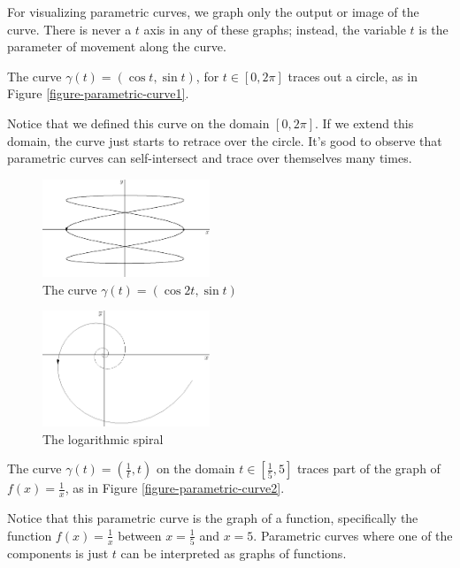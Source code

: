 \documentclass[fleqn,letterpaper]{report}
\begin{document}
For visualizing parametric curves, we graph only the output or
image of the curve. There is never a $t$ axis in any of these
graphs; instead, the variable $t$ is the parameter of movement
along the curve. 

\begin{example}
The curve $\gamma(t) = (\cos t, \sin t)$, for $t \in [0,
2\pi]$ traces out a circle, as in Figure
\ref{figure-parametric-curve1}. 
\end{example}

Notice that we defined this curve on the domain $[0, 2\pi]$. If
we extend this domain, the curve just starts to retrace over
the circle. It's good to observe that parametric curves can
self-intersect and trace over themselves many times.

\begin{figure}[t]
\centering
\includegraphics[width=5cm]{figure12.eps}
\caption{The curve $\gamma(t) = (\cos 2t, \sin t)$}
\label{figure-parametric-curve3}
\end{figure}

\begin{figure}[t]
\centering
\includegraphics[width=5cm]{figure13.eps}
\caption{The logarithmic spiral}
\label{figure-parametric-curve4}
\end{figure}

\begin{example}
The curve $\gamma(t) = \left(\frac{1}{t}, t \right)$
on the domain $t \in \left[\frac{1}{5},5 \right]$ traces part
of the graph of $f(x) = \frac{1}{x}$, as in Figure
\ref{figure-parametric-curve2}.
\end{example}

Notice that this parametric curve is the graph of a function,
specifically the function $f(x) = \frac{1}{x}$ between $x =
\frac{1}{5}$ and $x=5$. Parametric curves where one of the
components is just $t$ can be interpreted as graphs of
functions.
\end{document}
